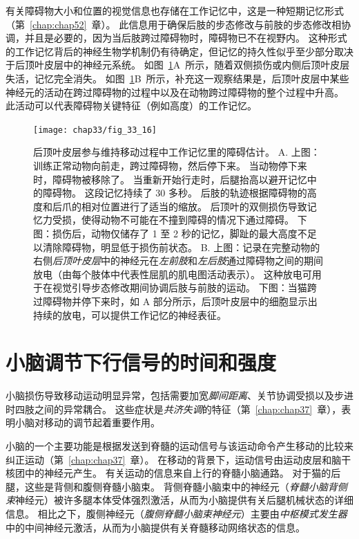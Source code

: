 有关障碍物大小和位置的视觉信息也存储在工作记忆中，这是一种短期记忆形式（第~\ref{chap:chap52}~章）。
此信息用于确保后肢的步态修改与前肢的步态修改相协调，并且是必要的，因为当后肢跨过障碍物时，障碍物已不在视野内。
这种形式的工作记忆背后的神经生物学机制仍有待确定，但记忆的持久性似乎至少部分取决于后顶叶皮层中的神经元系统。
如图~\ref{fig:33_16}A~所示，随着双侧损伤或内侧后顶叶皮层失活，记忆完全消失。
如图~\ref{fig:33_16}B~所示，补充这一观察结果是，后顶叶皮层中某些神经元的活动在跨过障碍物的过程中以及在动物跨过障碍物的整个过程中升高。
此活动可以代表障碍物关键特征（例如高度）的工作记忆。


\begin{figure}[htbp]
	\centering
	\texttt{[image: chap33/fig\_33\_16]}
	\caption{后顶叶皮层参与维持移动过程中工作记忆里的障碍估计。
		A. 上图：训练正常动物向前走，跨过障碍物，然后停下来。
		当动物停下来时，障碍物被移除了。
		当重新开始行走时，后腿抬高以避开记忆中的障碍物。
		这段记忆持续了 30 多秒。
		后肢的轨迹根据障碍物的高度和后爪的相对位置进行了适当的缩放。
		后顶叶的双侧损伤导致记忆力受损，使得动物不可能在不撞到障碍的情况下通过障碍。
		下图：损伤后，动物仅储存了 1 至 2 秒的记忆，脚趾的最大高度不足以清除障碍物，明显低于损伤前状态\cite{mcvea2009object}。
		B. 上图：记录在完整动物的右侧\textit{后顶叶皮层}中的神经元在\textit{左前肢}和\textit{左后肢}通过障碍物之间的期间放电（由每个肢体中代表性屈肌的肌电图活动表示）。
		这种放电可用于在视觉引导步态修改期间协调后肢与前肢的运动。
		下图：当猫跨过障碍物并停下来时，如 A 部分所示，后顶叶皮层中的细胞显示出持续的放电，可以提供工作记忆的神经表征\cite{lajoie2010neurons}。}
	\label{fig:33_16}
\end{figure}



\section{小脑调节下行信号的时间和强度}

小脑损伤导致移动运动明显异常，包括需要加宽\textit{脚间距离}、关节协调受损以及步进时四肢之间的异常耦合。
这些症状是\textit{共济失调}的特征（第~\ref{chap:chap37}~章），表明小脑对移动的调节起着重要作用。


小脑的一个主要功能是根据发送到脊髓的运动信号与该运动命令产生移动的比较来纠正运动（第~\ref{chap:chap37}~章）。
在移动的背景下，运动信号由运动皮层和脑干核团中的神经元产生。
有关运动的信息来自上行的脊髓小脑通路。
对于猫的后腿，这些是背侧和腹侧脊髓小脑束。
背侧脊髓小脑束中的神经元（\textit{脊髓小脑背侧束}神经元）被许多腿本体受体强烈激活，从而为小脑提供有关后腿机械状态的详细信息。
相比之下，腹侧神经元（\textit{腹侧脊髓小脑束神经元}）主要由\textit{中枢模式发生器}中的中间神经元激活，从而为小脑提供有关脊髓移动网络状态的信息。



